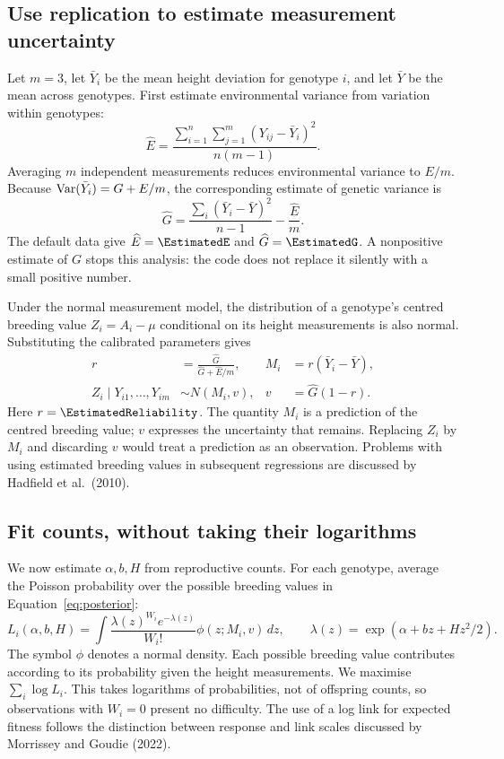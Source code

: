 \documentclass[11pt]{article}
\begin{document}
\subsection{Use replication to estimate measurement uncertainty}
Let $m=3$, let $\bar Y_i$ be the mean height deviation for genotype $i$, and let $\bar Y$ be the mean across genotypes. First estimate environmental variance from variation within genotypes:
\begin{equation}
 \widehat E=\frac{\sum_{i=1}^{n}\sum_{j=1}^{m}(Y_{ij}-\bar Y_i)^2}{n(m-1)}.
 \label{eq:Ehat}
\end{equation}
Averaging $m$ independent measurements reduces environmental variance to $E/m$. Because $\operatorname{Var}(\bar Y_i)=G+E/m$, the corresponding estimate of genetic variance is
\begin{equation}
 \widehat G=\frac{\sum_i(\bar Y_i-\bar Y)^2}{n-1}-\frac{\widehat E}{m}.
 \label{eq:Ghat}
\end{equation}
The default data give $\widehat E=\EstimatedE$ and $\widehat G=\EstimatedG$. A nonpositive estimate of $G$ stops this analysis: the code does not replace it silently with a small positive number.

Under the normal measurement model, the distribution of a genotype's centred breeding value $Z_i=A_i-\mu$ conditional on its height measurements is also normal. Substituting the calibrated parameters gives
\begin{align}
 r&=\frac{\widehat G}{\widehat G+\widehat E/m}, &
 M_i&=r(\bar Y_i-\bar Y),\label{eq:shrink}\\
 Z_i\mid Y_{i1},\ldots,Y_{im}&\sim N(M_i,v), &
 v&=\widehat G(1-r).\label{eq:posterior}
\end{align}
Here $r=\EstimatedReliability$. The quantity $M_i$ is a prediction of the centred breeding value; $v$ expresses the uncertainty that remains. Replacing $Z_i$ by $M_i$ and discarding $v$ would treat a prediction as an observation. Problems with using estimated breeding values in subsequent regressions are discussed by Hadfield et al.\ (2010).

\subsection{Fit counts, without taking their logarithms}
We now estimate $\alpha,b,H$ from reproductive counts. For each genotype, average the Poisson probability over the possible breeding values in Equation~\eqref{eq:posterior}:
\begin{equation}
 L_i(\alpha,b,H)=\int
 \frac{\lambda(z)^{W_i}e^{-\lambda(z)}}{W_i!}
 \phi(z;M_i,v)\,dz,
 \qquad \lambda(z)=\exp(\alpha+bz+Hz^2/2).
 \label{eq:likelihood}
\end{equation}
The symbol $\phi$ denotes a normal density. Each possible breeding value contributes according to its probability given the height measurements. We maximise $\sum_i\log L_i$. This takes logarithms of probabilities, not of offspring counts, so observations with $W_i=0$ present no difficulty. The use of a log link for expected fitness follows the distinction between response and link scales discussed by Morrissey and Goudie (2022).
\end{document}
